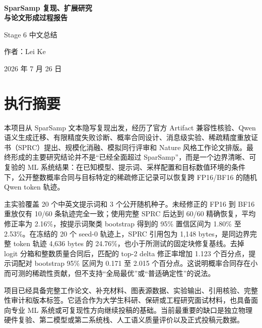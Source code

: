 \documentclass[12pt,a4paper]{article}
\begin{document}
\begin{titlepage}
\thispagestyle{empty}
\vspace*{0.16\textheight}
\noindent{\color{accent}\rule{\textwidth}{1.4pt}}\\[1.4cm]
{\Huge\bfseries SparSamp 复现、扩展研究\\[0.35cm]与论文形成过程报告\par}
\vspace{1.2cm}
{\Large Stage 6 中文总结\par}
\vfill
{\large 作者：Lei Ke\par}
\vspace{0.3cm}
{\large 2026 年 7 月 26 日\par}
\vspace{1.2cm}
\noindent{\color{accent}\rule{\textwidth}{1.4pt}}
\end{titlepage}

\tableofcontents
\clearpage
{}

\section*{执行摘要}

本项目从 SparSamp 文本隐写复现出发，经历了官方 Artifact 兼容性核验、Qwen 语义生成迁移、有限精度失败诊断、概率合同设计、消息级实验、稀疏精度重放证书（SPRC）提出、规模化消融、模拟同行评审和 Nature 风格工作论文排版。最终形成的主要研究结论并不是“已经全面超过 SparSamp”，而是一个边界清晰、可复验的 ML 系统结果：在已知模型、提示词、采样配置和目标数值环境的条件下，公开整数概率合同与目标特定的稀疏修正记录可以恢复跨 FP16/BF16 的随机 Qwen token 轨迹。

主实验覆盖 20 个中英文提示词和 3 个公开随机种子。未经修正的 FP16 到 BF16 重放仅有 10/60 条轨迹完全一致；使用完整 SPRC 后达到 60/60 精确恢复，平均修正率为 2.16\%，按提示词聚类 bootstrap 得到的 95\% 置信区间为 1.80\% 至 2.53\%。在冻结的 20 个 seed-0 轨迹上，SPRC 引用包为 1,148 bytes，是同边界完整 token 轨迹 4,636 bytes 的 24.76\%，也小于所测试的固定块修复基线。去掉 logit 分箱和整数质量合同后，匹配的 top-2 delta 修正率增加 1.123 个百分点，提示词配对 bootstrap 95\% 区间为 0.171 至 2.015 个百分点。这说明概率合同存在小而可测的稀疏性贡献，但不支持“全局最优”或“普适确定性”的说法。

项目已经具备完整工作论文、补充材料、图表源数据、实验输出、引用核验、完整性审计和版本标签。它适合作为大学生科研、保研或工程研究面试材料，也具备面向专业 ML 系统或可复现性方向继续投稿的基础。当前最重要的缺口是独立物理硬件复验、第二模型或第二系统栈、人工语义质量评价以及正式投稿元数据。
\end{document}
